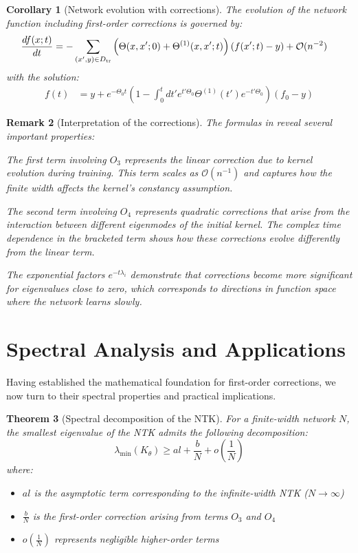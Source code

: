 \documentclass[11pt,a4paper]{article}
\newtheorem{theorem}{Theorem}[section]
\newtheorem{corollary}[theorem]{Corollary}
\newtheorem{remark}[theorem]{Remark}
\theoremstyle{definition}
\begin{document}
\begin{corollary}[Network evolution with corrections]\label{cor:network_evolution}
The evolution of the network function including first-order corrections is governed by:
\begin{align}
\frac{df(x;t)}{dt} &= -\sum_{(x',y)\in D_{\rm tr}}\left(\Theta(x,x';0)+\Theta^{(1)}(x,x';t)\right)\left(f(x';t)-y\right) + \mathcal{O}(n^{-2}) \label{eq:evolution_ode}
\end{align}
with the solution:
\begin{align}
f(t) &= y + e^{-\Theta_{0}t}\left(1-\int_{0}^{t}dt'e^{t'\Theta_{0}}\Theta^{(1)}(t')e^{-t'\Theta_{0}}\right)\left(f_{0}-y\right) \label{eq:evolution_solution}
\end{align}
\end{corollary}

\begin{remark}[Interpretation of the corrections]
The formulas in  reveal several important properties:

The first term involving $O_3$ represents the linear correction due to kernel evolution during training. This term scales as $\mathcal{O}(n^{-1})$ and captures how the finite width affects the kernel's constancy assumption.

The second term involving $O_4$ represents quadratic corrections that arise from the interaction between different eigenmodes of the initial kernel. The complex time dependence in the bracketed term shows how these corrections evolve differently from the linear term.

The exponential factors $e^{-t\lambda_i}$ demonstrate that corrections become more significant for eigenvalues close to zero, which corresponds to directions in function space where the network learns slowly.
\end{remark}

\newpage

\section{Spectral Analysis and Applications}

Having established the mathematical foundation for first-order corrections, we now turn to their spectral properties and practical implications.

\begin{theorem}[Spectral decomposition of the NTK]\label{thm:spectral}
For a finite-width network $N$, the smallest eigenvalue of the NTK admits the following decomposition:
\[ \lambda_{\min}(K_\theta) \geq al + \frac{b}{N} + o(\frac{1}{N}) \]
where:
\begin{itemize}
\item $al$ is the asymptotic term corresponding to the infinite-width NTK ($N \to \infty$)
\item $\frac{b}{N}$ is the first-order correction arising from terms $O_3$ and $O_4$
\item $o(\frac{1}{N})$ represents negligible higher-order terms
\end{itemize}
\end{theorem}
\end{document}
